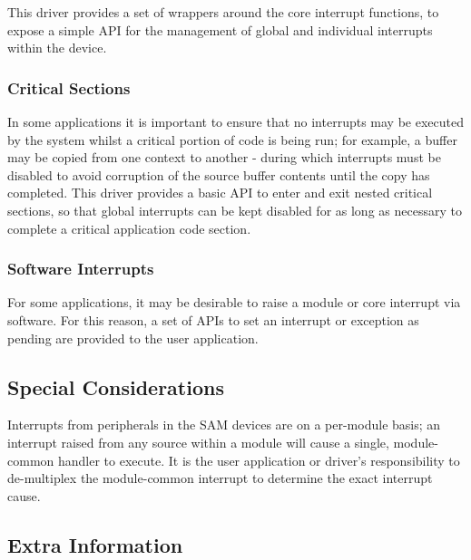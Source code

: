 This driver provides a set of wrappers around the core interrupt functions, to expose a simple A\+P\+I for the management of global and individual interrupts within the device.\hypertarget{group__asfdoc__sam0__system__interrupt__group_asfdoc_sam0_system_interrupt_module_overview_criticalsec}{}\subsubsection{Critical Sections}\label{group__asfdoc__sam0__system__interrupt__group_asfdoc_sam0_system_interrupt_module_overview_criticalsec}
In some applications it is important to ensure that no interrupts may be executed by the system whilst a critical portion of code is being run; for example, a buffer may be copied from one context to another -\/ during which interrupts must be disabled to avoid corruption of the source buffer contents until the copy has completed. This driver provides a basic A\+P\+I to enter and exit nested critical sections, so that global interrupts can be kept disabled for as long as necessary to complete a critical application code section.\hypertarget{group__asfdoc__sam0__system__interrupt__group_asfdoc_sam0_system_interrupt_module_overview_softints}{}\subsubsection{Software Interrupts}\label{group__asfdoc__sam0__system__interrupt__group_asfdoc_sam0_system_interrupt_module_overview_softints}
For some applications, it may be desirable to raise a module or core interrupt via software. For this reason, a set of A\+P\+Is to set an interrupt or exception as pending are provided to the user application.\hypertarget{group__asfdoc__sam0__system__interrupt__group_asfdoc_sam0_system_interrupt_special_considerations}{}\subsection{Special Considerations}\label{group__asfdoc__sam0__system__interrupt__group_asfdoc_sam0_system_interrupt_special_considerations}
Interrupts from peripherals in the S\+A\+M devices are on a per-\/module basis; an interrupt raised from any source within a module will cause a single, module-\/common handler to execute. It is the user application or driver's responsibility to de-\/multiplex the module-\/common interrupt to determine the exact interrupt cause.\hypertarget{group__asfdoc__sam0__system__interrupt__group_asfdoc_sam0_system_interrupt_extra_info}{}\subsection{Extra Information}\label{group__asfdoc__sam0__system__interrupt__group_asfdoc_sam0_system_interrupt_extra_info}
